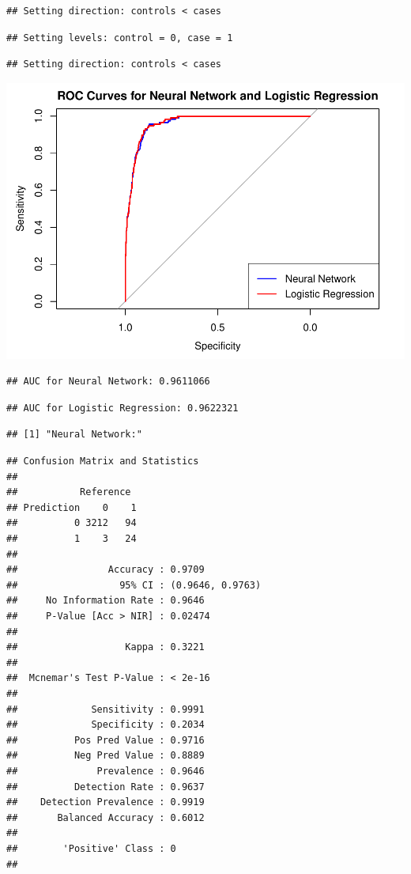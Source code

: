 \documentclass[
]{article}
\begin{document}
\begin{verbatim}
## Setting direction: controls < cases
\end{verbatim}

\begin{verbatim}
## Setting levels: control = 0, case = 1
\end{verbatim}

\begin{verbatim}
## Setting direction: controls < cases
\end{verbatim}

\includegraphics{A4_files/figure-latex/unnamed-chunk-19-1.pdf}

\begin{verbatim}
## AUC for Neural Network: 0.9611066
\end{verbatim}

\begin{verbatim}
## AUC for Logistic Regression: 0.9622321
\end{verbatim}

\begin{verbatim}
## [1] "Neural Network:"
\end{verbatim}

\begin{verbatim}
## Confusion Matrix and Statistics
## 
##           Reference
## Prediction    0    1
##          0 3212   94
##          1    3   24
##                                           
##                Accuracy : 0.9709          
##                  95% CI : (0.9646, 0.9763)
##     No Information Rate : 0.9646          
##     P-Value [Acc > NIR] : 0.02474         
##                                           
##                   Kappa : 0.3221          
##                                           
##  Mcnemar's Test P-Value : < 2e-16         
##                                           
##             Sensitivity : 0.9991          
##             Specificity : 0.2034          
##          Pos Pred Value : 0.9716          
##          Neg Pred Value : 0.8889          
##              Prevalence : 0.9646          
##          Detection Rate : 0.9637          
##    Detection Prevalence : 0.9919          
##       Balanced Accuracy : 0.6012          
##                                           
##        'Positive' Class : 0               
## 
\end{verbatim}
\end{document}
